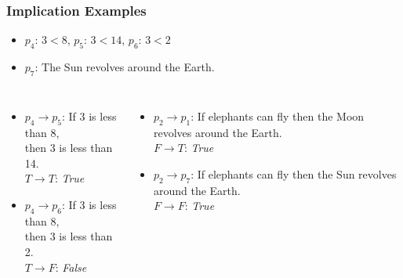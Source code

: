 \documentclass[dvipsnames]{beamer}
\begin{document}
\begin{frame}
  \frametitle{Implication Examples}

  \begin{example}
    \begin{itemize}
      \item $p_4$: $3<8$, $p_5$: $3<14$, $p_6$: $3<2$
      \item $p_7$: The Sun revolves around the Earth.
    \end{itemize}

    \pause
    \begin{columns}[t]
        \begin{itemize}
          \item $p_4 \rightarrow p_5$: If 3 is less than 8,\\
            then 3 is less than 14.\\
            $T \rightarrow T$: \emph{True}
          \pause
          \item $p_4 \rightarrow p_6$: If 3 is less than 8,\\
            then 3 is less than 2.\\
            $T \rightarrow F$: \emph{False}
        \end{itemize}

      \pause
        \begin{itemize}
          \item $p_2 \rightarrow p_1$: If elephants can fly then the Moon
            revolves around the Earth.\\
            $F \rightarrow T$: \emph{True}
          \pause
          \item $p_2 \rightarrow p_7$: If elephants can fly then the Sun
            revolves around the Earth.
            \\
            $F \rightarrow F$: \emph{True}
        \end{itemize}
    \end{columns}
  \end{example}
\end{frame}
\end{document}
